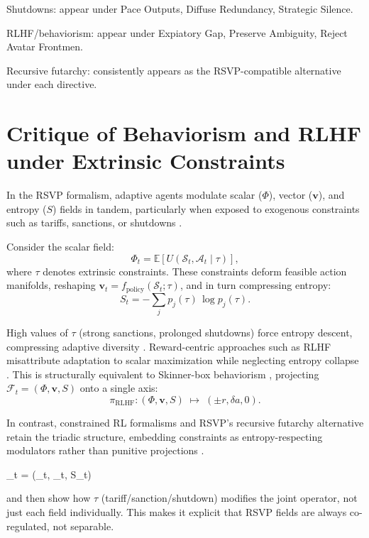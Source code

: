 \documentclass{article}
\begin{document}
Shutdowns: appear under Pace Outputs, Diffuse Redundancy, Strategic Silence.

RLHF/behaviorism: appear under Expiatory Gap, Preserve Ambiguity, Reject Avatar Frontmen.

Recursive futarchy: consistently appears as the RSVP-compatible alternative under each directive.

\section{Critique of Behaviorism and RLHF under Extrinsic Constraints}

In the RSVP formalism, adaptive agents modulate scalar ($\Phi$), vector ($\mathbf{v}$),
and entropy ($S$) fields in tandem, particularly when exposed to exogenous constraints 
such as tariffs, sanctions, or shutdowns \citep{kummel2020entropy,chen2018value,rosalux2025sanctions}.

Consider the scalar field:
\[
\Phi_t = \mathbb{E}\!\left[ U(\mathcal{S}_t, \mathcal{A}_t \mid \tau) \right],
\]
where $\tau$ denotes extrinsic constraints. These constraints deform feasible 
action manifolds, reshaping $\mathbf{v}_t = f_{\mathrm{policy}}(\mathcal{S}_t;\tau)$, 
and in turn compressing entropy:
\[
S_t = -\sum_j p_j(\tau)\,\log p_j(\tau).
\]

High values of $\tau$ (strong sanctions, prolonged shutdowns) force entropy descent, 
compressing adaptive diversity \citep{ramshaw2022maximum,cao2022entropy}. 
Reward-centric approaches such as RLHF misattribute adaptation to scalar maximization 
while neglecting entropy collapse \citep{chaudhari2024rlhf,bolland2025maxent,cui2025entropy}. 
This is structurally equivalent to Skinner-box behaviorism \citep{skinner1953science}, 
projecting $\mathcal{F}_t=(\Phi,\mathbf{v},S)$ onto a single axis:
\[
\pi_{\mathrm{RLHF}}: (\Phi,\mathbf{v},S) \;\mapsto\; (\pm r, \delta a, 0).
\]

In contrast, constrained RL formalisms and RSVP’s recursive futarchy alternative 
retain the triadic structure, embedding constraints as entropy-respecting 
modulators rather than punitive projections \citep{achiam2017constrained,caicoya2024constrained,ueda2024entropy}.

_t = (\Phi_t, _t, S_t)

and then show how $\tau$ (tariff/sanction/shutdown) modifies the joint operator, not just each field individually. This makes it explicit that RSVP fields are always co-regulated, not separable.
\end{document}
